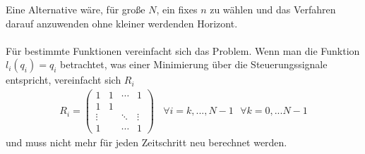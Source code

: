 \documentclass[12pt,a4paper]{article}
\begin{document}
  Eine Alternative wäre, für große $N$, ein fixes $n$ zu wählen und das Verfahren darauf anzuwenden ohne kleiner werdenden Horizont.\\
  \\
  Für bestimmte Funktionen vereinfacht sich das Problem. Wenn man die Funktion $l_i(q_i) =q_i$ betrachtet, was einer Minimierung über die Steuerungssignale entspricht, vereinfacht sich $R_i$
  \begin{align*}
  R_i = 
  \begin{pmatrix}
  1 & 1 & \cdots & 1 \\
  1 & 1 & &  \\
  \vdots & & \ddots & \vdots \\
  1 & & \cdots & 1
  \end{pmatrix} \ \ \ \ \forall i=k, ..., N-1 \ \ \  \forall k=0,...N-1
  \end{align*}
  und muss nicht mehr für jeden Zeitschritt neu berechnet werden.
\end{document}
